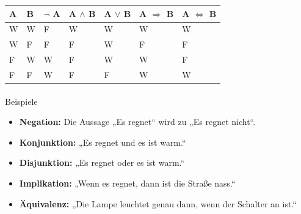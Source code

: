 \documentclass[
  11pt,
  a4paper,
  DIV=11,
  numbers=noendperiod]{scrartcl}
\makeatletter
\let\oldparagraph\paragraph
\renewcommand{\paragraph}{
    \@ifstar
      \xxxParagraphStar
      \xxxParagraphNoStar
  }
\newcommand{\xxxParagraphStar}[1]{\oldparagraph*{#1}\mbox{}}
\newcommand{\xxxParagraphNoStar}[1]{\oldparagraph{#1}\mbox{}}
\providecommand{\tightlist}{%
  \setlength{\itemsep}{0pt}\setlength{\parskip}{0pt}}\usepackage{longtable,booktabs,array}
\makeatother
\begin{document}
\begin{longtable}[]{@{}
  >{\raggedright\arraybackslash}p{}
  >{\raggedright\arraybackslash}p{}
  >{\raggedright\arraybackslash}p{}
  >{\raggedright\arraybackslash}p{}
  >{\raggedright\arraybackslash}p{}
  >{\raggedright\arraybackslash}p{}
  >{\raggedright\arraybackslash}p{}@{}}
\toprule\noalign{}
\begin{minipage}[b]{\linewidth}\raggedright
A
\end{minipage} & \begin{minipage}[b]{\linewidth}\raggedright
B
\end{minipage} & \begin{minipage}[b]{\linewidth}\raggedright
\(\neg\) A
\end{minipage} & \begin{minipage}[b]{\linewidth}\raggedright
A \(\land\) B
\end{minipage} & \begin{minipage}[b]{\linewidth}\raggedright
A \(\lor\) B
\end{minipage} & \begin{minipage}[b]{\linewidth}\raggedright
A \(\Rightarrow\) B
\end{minipage} & \begin{minipage}[b]{\linewidth}\raggedright
A \(\Leftrightarrow\) B
\end{minipage} \\
\midrule\noalign{}
\endhead
\bottomrule\noalign{}
\endlastfoot
W & W & F & W & W & W & W \\
W & F & F & F & W & F & F \\
F & W & W & F & W & W & F \\
F & F & W & F & F & W & W \\
\end{longtable}

\paragraph{Beispiele}\label{beispiele}

\begin{itemize}
\tightlist
\item
  \textbf{Negation:} Die Aussage „Es regnet`` wird zu „Es regnet
  nicht``.
\item
  \textbf{Konjunktion:} „Es regnet und es ist warm.``
\item
  \textbf{Disjunktion:} „Es regnet oder es ist warm.``
\item
  \textbf{Implikation:} „Wenn es regnet, dann ist die Straße nass.``
\item
  \textbf{Äquivalenz:} „Die Lampe leuchtet genau dann, wenn der Schalter
  an ist.``
\end{itemize}
\end{document}
